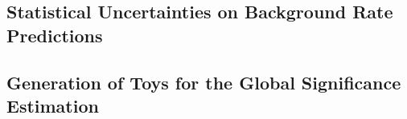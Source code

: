 \subsection{Statistical Uncertainties on Background Rate Predictions}%
\label{app:barlow_beeston}



\clearpage
\subsection{Generation of Toys for the Global Significance Estimation}%
\label{app:toy_generation}



